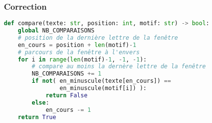 \documentclass[svgnames,11pt]{beamer}
\begin{document}
\begin{frame}[fragile]
    \frametitle{Correction}

    \begin{center}
    \begin{lstlisting}[language=Python , basicstyle=\ttfamily\small, xleftmargin=0.2em, xrightmargin=-4em]
def compare(texte: str, position: int, motif: str) -> bool:
    global NB_COMPARAISONS
    # position de la dernière lettre de la fenêtre
    en_cours = position + len(motif)-1
    # parcours de la fenêtre à l'envers
    for i in range(len(motif)-1, -1, -1):
        # compare au moins la dernère lettre de la fenêtre
        NB_COMPARAISONS += 1
        if not( en_minuscule(texte[en_cours]) == 
                en_minuscule(motif[i]) ):
            return False
        else:
            en_cours -= 1
    return True
\end{lstlisting}
    \end{center}

\end{frame}
\end{document}
